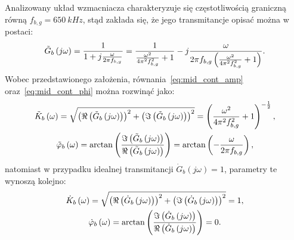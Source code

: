 Analizowany układ wzmacniacza charakteryzuje się częstotliwością graniczną równą $f_{b,g} = \qty{650}{kHz}$, stąd zakłada się, że jego transmitancje opisać można w postaci:
\begin{equation}
\tilde{G}_{b} \left(j\omega\right) = \frac{1}{1 + j \frac{\omega}{2 \pi f_{b,g}}} = \frac{1}{\frac{\omega^{2}}{4 \pi^{2} f_{b,g}^{2}} + 1} - j \frac{\omega}{2 \pi f_{b,g} \left( \frac{\omega^{2}}{4 \pi^{2} f_{b,g}^{2}} + 1 \right) } \label{eq:sym_partb_trans}.
\end{equation}
Wobec przedstawionego założenia, równania~\eqref{eq:mid_cont_amp} oraz~\eqref{eq:mid_cont_phi} można rozwinąć jako:
\begin{gather}
\tilde{K}_{b} \left(\omega\right) = \sqrt{\left( \Re \left( \tilde{G}_{b} \left(j\omega\right) \right) \right)^{2} + \left( \Im \left( \tilde{G}_{b} \left(j\omega\right) \right) \right)^{2}} = \left( \frac{\omega^{2}}{4 \pi^{2} f_{b,g}^{2}} + 1 \right)^{-\frac{1}{2}} \label{eq:sym_partb_amp_real}, \\
\tilde{\varphi}_{b} \left(\omega\right) = \arctan \left( \frac{\Im \left( \tilde{G}_{b} \left(j\omega\right) \right)}{\Re \left( \tilde{G}_{b} \left(j\omega\right) \right)} \right) = \arctan \left( -\frac{\omega}{2 \pi f_{b,g}} \right) \label{eq:sym_partb_phi_real},
\end{gather}
natomiast w przypadku idealnej transmitancji $\dot{G}_{b}(j\omega) = 1$, parametry te wynoszą kolejno:
\begin{gather}
\dot{K}_{b} \left(\omega\right) = \sqrt{\left( \Re \left( \dot{G}_{b} \left(j\omega\right) \right) \right)^{2} + \left( \Im \left( \dot{G}_{b} \left(j\omega\right) \right) \right)^{2}} = 1 \label{eq:sym_partb_amp_ideal}, \\
\dot{\varphi}_{b} \left(\omega\right) = \arctan \left( \frac{\Im \left( \dot{G}_{b} \left(j\omega\right) \right)}{\Re \left( \dot{G}_{b} \left(j\omega\right) \right)} \right) = 0 \label{eq:sym_partb_phi_ideal}.
\end{gather}

